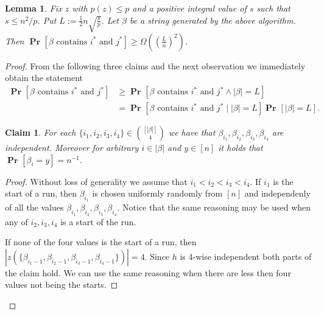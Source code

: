 \documentclass{article}
\newcommand{\probs}[2]{\operatorname{\mathbf{Pr}}_{{#1}}\left[{#2}\right]}
\newcommand{\prob}[1]{\probs{}{#1}}
\newtheorem{lemma}{Lemma}
\newtheorem{claim}{Claim}
\begin{document}
\begin{lemma}
Fix $z$ with $p(z) \leq p$ and a positive integral value of $s$ such that $s \leq n^2/p$.
Put $L := \frac{1}{2}n\sqrt{\frac{s}{p}}$.
Let $\beta$ be a string generated by the above algorithm. 
Then $\prob{\beta\mbox{ contains }i^{*}\mbox{ and }j^{*}} \geq \Omega\left(\left(\frac{L}{n}\right)^2\right)$.
\end{lemma}
\begin{proof}
From the following three claims and the next observation we immediately obtain the statement
\begin{align*}
    \prob{\beta\mbox{ contains }i^{*}\mbox{ and }j^{*}} 
        & \geq \prob{\beta\mbox{ contains }i^{*}\mbox{ and }j^{*} \wedge |\beta| = L} \\
        & = \prob{\beta\mbox{ contains }i^{*}\mbox{ and }j^{*} \mid |\beta| = L}\prob{|\beta| = L}.
\end{align*}

\begin{claim}
\label{claim-independence}
For each $\{i_1, i_2, i_3, i_4\} \in \binom{[|\beta|]}{4}$ we have that $\beta_{i_1}, \beta_{i_2}, \beta_{i_3}, \beta_{i_4}$ are independent. Moreover for arbitrary $i \in |\beta|$ and $y \in [n]$ it holds that $\prob{\beta_{i} = y} = n^{-1}$.
\end{claim}
\begin{proof}
Without loss of generality we assume that $i_1 < i_2 < i_3 < i_4$. If $i_1$ is the start of a run, then $\beta_{i_1}$ is chosen uniformly randomly from $[n]$ and independenly of all the values $\beta_{i_1}, \beta_{i_2}, \beta_{i_3}, \beta_{i_4}$.
Notice that the same reasoning may be used when any of $i_2, i_3, i_4$ is a start of the run.

If none of the four values is the start of a run, then $|z(\{\beta_{i_1 - 1}, \beta_{i_2 - 1}, \beta_{i_3 - 1}, \beta_{i_4 - 1}\})| = 4$. 
Since $h$ is 4-wise independent both parts of the claim hold.
We can use the same reasoning when there are less then four values not being the starts.
\end{proof}


\end{proof}
\end{document}
